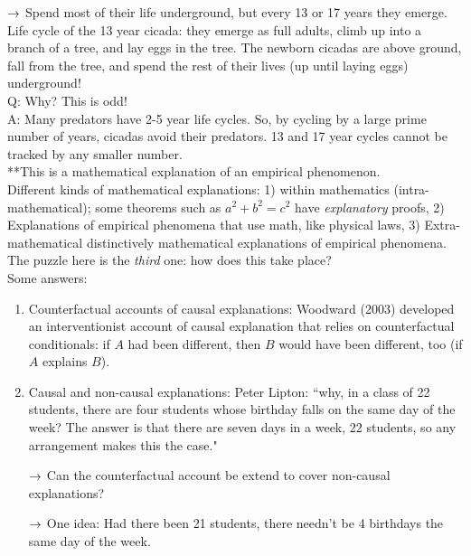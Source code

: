 $\rightarrow$ Spend most of their life underground, but every 13 or 17 years they emerge. \\

Life cycle of the 13 year cicada: they emerge as full adults, climb up into a branch of a tree, and lay eggs in the tree. The newborn cicadas are above ground, fall from the tree, and spend the rest of their lives (up until laying eggs) underground! \\

Q: Why? This is odd! \\

A: Many predators have 2-5 year life cycles. So, by cycling by a large prime number of years, cicadas avoid their predators. 13 and 17 year cycles cannot be tracked by any smaller number. \\

**This is a mathematical explanation of an empirical phenomenon. \\

Different kinds of mathematical explanations: 1) within mathematics (intra-mathematical); some theorems such as $a^2 + b^2 = c^2$ have {\it explanatory} proofs, 2) Explanations of empirical phenomena that use math, like physical laws, 3) Extra-mathematical distinctively mathematical explanations of empirical phenomena. \\

The puzzle here is the {\it third} one: how does this take place? \\

Some answers:
\begin{enumerate}
	\item Counterfactual accounts of causal explanations: Woodward (2003) developed an interventionist account of causal explanation that relies on counterfactual conditionals: if $A$ had been different, then $B$ would have been different, too (if $A$ explains $B$).
	\item Causal and non-causal explanations: Peter Lipton: ``why, in a class of 22 students, there are four students whose birthday falls on the same day of the week? The answer is that there are seven days in a week, 22 students, so any arrangement makes this the case." 

	$\rightarrow$ Can the counterfactual account be extend to cover non-causal explanations?

	$\rightarrow$ One idea: Had there been 21 students, there needn't be 4 birthdays the same day of the week.
\end{enumerate}

